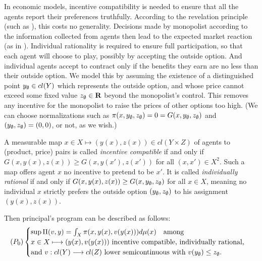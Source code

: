 In economic models, 
incentive compatibility is  needed to ensure that all the agents report their preferences truthfully. 
According to the revelation principle (such as \cite{Myerson79}), this costs no generality.
Decisions made by monopolist according to the information collected from agents then lead 
to the expected market reaction (as in \cite{Carlier01,RochetChone98}).  
Individual rationality
is required to ensure full participation, so that each agent will choose to play,  possibly by accepting the outside option. And individual agents accept to contract only if the benefits they earn are no less than their outside option. We model this by assuming the existence of a distinguished point $y_{\emptyset} \in cl(Y)$ which represents the outside option, and whose price cannot exceed some fixed value $z_{\emptyset} \in {\mathbf R}$ beyond the monopolist's control. This removes any incentive for the monopolist to raise the prices of other options too high. (We can choose normalizations such as $\pi(x,y_{\emptyset},z_{\emptyset})=0=G(x,y_{\emptyset},z_{\emptyset})$ and $(y_{\emptyset},z_{\emptyset})=(0,0)$, or not, as we wish.)\medskip

\begin{definition}
	A measurable map $x \in X \longmapsto (y(x),z(x)) \in cl(Y \times Z)$ of agents to (product, price) pairs
	is called {\em incentive compatible} if and only if $G(x,y(x),z(x)) \ge G(x, y(x'), z(x'))$ for all $(x,x')\in X^2$.
	Such a map offers agent $x$ no incentive to pretend to be $x'$.
	It is called {\em individually rational} if and only if $G(x,y(x),z(x)) \ge G(x,y_{\emptyset},z_{\emptyset})$ for all $x \in X$,
	meaning no individual $x$ strictly prefers the outside option $(y_{\emptyset},z_{\emptyset})$ to his assignment $(y(x),z(x))$.
\end{definition}

\begin{proposition}
	Then principal's program can be described as follows:
	\begin{equation*}
	(P_0)
	\begin{cases}
	\sup \Pi(v,y)=\int_{X} \pi(x, y(x), v(y(x))) d\mu(x)\quad \text{among}\\ 
	x \in X \longmapsto (y(x),v(y(x))) \text{  incentive compatible,  individually rational,}\\ 
	{ \text{and}\ v:cl(Y)\longrightarrow cl (Z)\  \text{lower semicontinuous with}\ v(y_{\emptyset}) \le z_{\emptyset}}. 
	\end{cases}
	\end{equation*}
\end{proposition}

